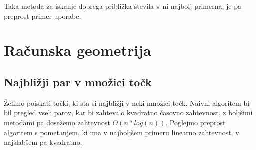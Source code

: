 \documentclass[10pt,a4paper,oneside]{book}
\begin{document}

Taka metoda za iskanje dobrega približka števila $\pi$ ni najbolj primerna, je pa preprost primer uporabe.

\chapter{Računska geometrija}
\section{Najbližji par v množici točk}
Želimo poiskati točki, ki sta si najbližji v neki množici točk. Naivni algoritem bi bil pregled vseh parov, kar bi zahtevalo kvadratno časovno zahtevnost, z boljšimi metodami pa dosežemo zahtevnost $O(n*log(n))$. Poglejmo preprost algoritem s pometanjem, ki ima v najboljšem primeru linearno zahtevnost, v najslabšem pa kvadratno.


%

\end{document}
